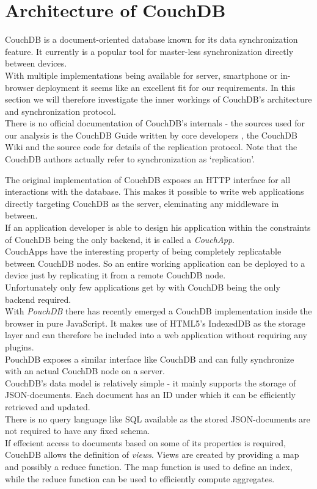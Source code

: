 
\chapter{Architecture of CouchDB}
\label{sec:couchdb}
CouchDB is a document-oriented database known for its data synchronization feature.
It currently is a popular tool for master-less synchronization directly between devices.\\
With multiple implementations being available for server, smartphone or in-browser deployment it seems like an excellent fit for our requirements.
In this section we will therefore investigate the inner workings of CouchDB's architecture and synchronization protocol.\\
There is no official documentation of CouchDB's internals - the sources used for our analysis is the CouchDB Guide written by core developers \cite{anderson2010couchdb}, the CouchDB Wiki \cite{couchdb_wiki} and the source code \cite{couchdb_source} for details of the replication protocol.
Note that the CouchDB authors actually refer to synchronization as `replication'.

The original implementation of CouchDB exposes an HTTP interface for all interactions with the database.
This makes it possible to write web applications directly targeting CouchDB as the server, eleminating any middleware in between.\\
If an application developer is able to design his application within the constraints of CouchDB being the only backend, it is called a \emph{CouchApp}.\\
CouchApps have the interesting property of being completely replicatable between CouchDB nodes.
So an entire working application can be deployed to a device just by replicating it from a remote CouchDB node.\\
Unfortunately only few applications get by with CouchDB being the only backend required.\\

With \emph{PouchDB} there has recently emerged a CouchDB implementation inside the browser in pure JavaScript.
It makes use of HTML5's IndexedDB as the storage layer and can therefore be included into a web application without requiring any plugins.\\
PouchDB exposes a similar interface like CouchDB and can fully synchronize with an actual CouchDB node on a server.\\

CouchDB's data model is relatively simple - it mainly supports the storage of JSON-documents.
Each document has an ID under which it can be efficiently retrieved and updated.\\
There is no query language like SQL available as the stored JSON-documents are not required to have any fixed schema.\\
If effecient access to documents based on some of its properties is required, CouchDB allows the definition of \emph{views}.
Views are created by providing a map and possibly a reduce function.
The map function is used to define an index, while the reduce function can be used to efficiently compute aggregates.\\


